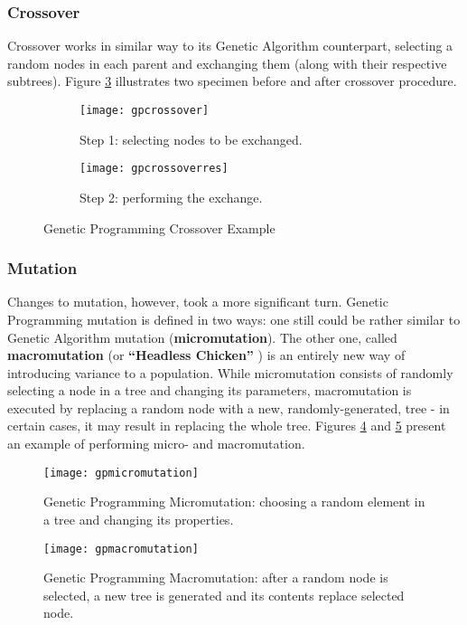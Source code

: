 \subsubsection{Crossover}
Crossover works in similar way to its Genetic Algorithm counterpart, selecting a random nodes in each parent and exchanging them (along with their respective subtrees). Figure \ref{fig:x gpcrossoverexample} illustrates two specimen before and after crossover procedure.
\begin{figure}[h]
    \centering
    \begin{subfigure}[b]{0.5\textwidth}
        \centering
        \texttt{[image: gpcrossover]}
        \caption{Step 1: selecting nodes to be exchanged.}
        \label{fig:gpcrossover1}
    \end{subfigure}
    \hfill
    \begin{subfigure}[b]{0.5\textwidth}
        \centering
        \texttt{[image: gpcrossoverres]}
        \caption{Step 2: performing the exchange.}
        \label{fig:gpcrossover2}
    \end{subfigure}
    \caption{Genetic Programming Crossover Example}
    \label{fig:x gpcrossoverexample}
\end{figure}
\subsubsection{Mutation}
Changes to mutation, however, took a more significant turn. Genetic Programming mutation is defined in two ways: one still could be rather similar to Genetic Algorithm mutation (\textbf{micromutation}). The other one, called \textbf{macromutation} (or \textbf{``Headless Chicken''} ) is an entirely new way of introducing variance to a population. While micromutation consists of randomly selecting a node in a tree and changing its parameters, macromutation is executed by replacing a random node with a new, randomly-generated, tree - in certain cases, it may result in replacing the whole tree. Figures \ref{fig:x gpmicromutationexample} and \ref{fig:x gpmacromutationexample} present an example of performing micro- and macromutation.
\begin{figure}[h]
    \centering
    \texttt{[image: gpmicromutation]}
    \caption{Genetic Programming Micromutation: choosing a random element in a tree and changing its properties.}
    \label{fig:x gpmicromutationexample}
\end{figure}
\begin{figure}[h]
    \centering
    \texttt{[image: gpmacromutation]}
    \caption{Genetic Programming Macromutation: after a random node is selected, a new tree is generated and its contents replace selected node.}
    \label{fig:x gpmacromutationexample}
\end{figure}
